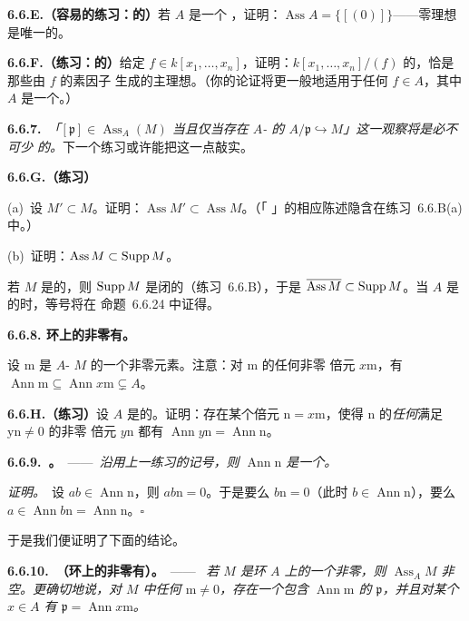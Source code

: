 \textbf{6.6.E.（容易的练习：\trIntegralDomain{}的\trAssociatedPoint）}\quad 若 $A$ 是一个%
\trIntegralDomain，证明：$\operatorname{Ass}A=\{[(0)]\}$——零理想是唯一的\trAssociatedPrimeIdeal{}。

\textbf{6.6.F.（练习：\trHypersurface{}的\trAssociatedPoint）}\quad 给定
$f\in k[x_1,\dots,x_n]$，证明：$k[x_1,\dots,x_n]/(f)$ 的\trAssociatedPrimeIdeal{}，恰是那些由 $f$ 的素因子
生成的主理想。（你的论证将更一般地适用于任何 $f\in A$，其中 $A$ 是一个\trUFD。）

\textbf{6.6.7.}\ \emph{「$[\mathfrak{p}]\in\operatorname{Ass}_A(M)$ 当且仅当存在 $A$-%
\trModule{}的\trInclusionMap{} $A/\mathfrak{p}\hookrightarrow M$」这一观察将是必不可少
的。}下一个练习或许能把这一点敲实。

\textbf{6.6.G.（练习）}

(a)~设 $M'\subset M$。证明：$\operatorname{Ass}M'\subset\operatorname{Ass}M$。（「%
\trSupport」的相应陈述隐含在练习~6.6.B(a) 中。）

(b)~证明：$\operatorname{Ass}M\subset\operatorname{Supp} M$。

若 $M$ 是\trFinitelyGenerated{}的，则 $\operatorname{Supp} M$ 是闭的（练习~6.6.B），于是
$\overline{\operatorname{Ass}M}\subset\operatorname{Supp} M$。当 $A$ 是\trNoetherian{}的时，等号将在
命题~6.6.24 中证得。

\textbf{6.6.8. \trNoetherian{}环上的非零\trModule{}有\trAssociatedPoint。}

设 $\mathrm{m}$ 是 $A$-\trModule{} $M$ 的一个非零元素。注意：对 $\mathrm{m}$ 的任何非零
倍元 $x\mathrm{m}$，有 $\operatorname{Ann}\mathrm{m}\subseteq\operatorname{Ann}x\mathrm{m}%
\subsetneq A$。

\textbf{6.6.H.（练习）}\quad 设 $A$ 是\trNoetherian{}的。证明：存在某个倍元
$\mathrm{n}=x\mathrm{m}$，使得 $\mathrm{n}$ 的\emph{任何}满足 $\mathrm{yn}\neq 0$ 的非零
倍元 $y\mathrm{n}$ 都有 $\operatorname{Ann}y\mathrm{n}=\operatorname{Ann}\mathrm{n}$。

\textbf{6.6.9.\ \trhProposition。}\ ——\ \emph{沿用上一练习的记号，则
$\operatorname{Ann}\mathrm{n}$ 是一个\trPrimeIdeal。}

\emph{证明。}\ 设 $ab\in\operatorname{Ann}\mathrm{n}$，则 $ab\mathrm{n}=0$。于是要么
$b\mathrm{n}=0$（此时 $b\in\operatorname{Ann}\mathrm{n}$），要么
$a\in\operatorname{Ann}b\mathrm{n}=\operatorname{Ann}\mathrm{n}$。\hfill$\square$

于是我们便证明了下面的结论。

\textbf{6.6.10.\ \trhProposition{}（\trNoetherian{}环上的非零\trModule{}有\trAssociatedPrimeIdeal{}）。}\ ——\ %
\emph{若 $M$ 是\trNoetherian{}环 $A$ 上的一个非零\trModule，则 $\operatorname{Ass}_A M$
非空。更确切地说，对 $M$ 中任何 $\mathrm{m}\neq 0$，存在一个包含
$\operatorname{Ann}\mathrm{m}$ 的\trAssociatedPrimeIdeal{} $\mathfrak{p}$，并且对某个 $x\in A$ 有
$\mathfrak{p}=\operatorname{Ann}x\mathrm{m}$。}

